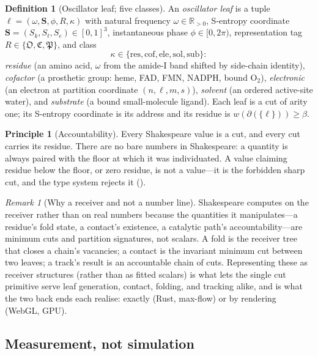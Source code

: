 \documentclass[11pt,a4paper]{article}
\theoremstyle{thmstyle}
\theoremstyle{definition}
\newtheorem{definition}[theorem]{Definition}
\newtheorem{principle}[theorem]{Principle}
\theoremstyle{remark}
\newtheorem{remark}[theorem]{Remark}
\newcommand{\R}{\mathbb{R}}
\newcommand{\flo}{\beta}
\newcommand{\cut}{\partial}
\newcommand{\Osc}{\mathfrak{O}}
\newcommand{\Cat}{\mathfrak{C}}
\newcommand{\Part}{\mathfrak{P}}
\begin{document}
\begin{definition}[Oscillator leaf; five classes]
\label{def:leaf}
An \emph{oscillator leaf} is a tuple
$\ell=(\omega,\mathbf{S},\phi,R,\kappa)$ with natural frequency
$\omega\in\R_{>0}$, S-entropy coordinate
$\mathbf{S}=(S_k,S_t,S_e)\in[0,1]^3$, instantaneous phase
$\phi\in[0,2\pi)$, representation tag $R\in\{\Osc,\Cat,\Part\}$, and class
\[
\kappa\in\{\mathrm{res},\mathrm{cof},\mathrm{ele},\mathrm{sol},\mathrm{sub}\}:
\]
\emph{residue} (an amino acid, $\omega$ from the amide-I band shifted by
side-chain identity), \emph{cofactor} (a prosthetic group: heme, FAD, FMN,
NADPH, bound $\mathrm{O_2}$), \emph{electronic} (an electron at partition
coordinate $(n,\ell,m,s)$), \emph{solvent} (an ordered active-site water),
and \emph{substrate} (a bound small-molecule ligand). Each leaf is a cut
of arity one; its S-entropy coordinate is its address and its residue is
$w(\cut(\{\ell\}))\ge\flo$.
\end{definition}

\begin{principle}[Accountability]
\label{prin:accountability}
Every Shakespeare value is a cut, and every cut carries its residue. There
are no bare numbers in Shakespeare: a quantity is always paired with the
floor at which it was individuated. A value claiming residue below the
floor, or zero residue, is not a value---it is the forbidden sharp cut, and
the type system rejects it ().
\end{principle}

\begin{remark}[Why a receiver and not a number line]
\label{rem:why-receiver}
Shakespeare computes on the receiver rather than on real numbers because
the quantities it manipulates---a residue's fold state, a contact's
existence, a catalytic path's accountability---are minimum cuts and
partition signatures, not scalars. A fold is the receiver tree that closes
a chain's vacancies; a contact is the invariant minimum cut between two
leaves; a track's result is an accountable chain of cuts. Representing
these as receiver structures (rather than as fitted scalars) is what lets
the single cut primitive serve leaf generation, contact, folding, and
tracking alike, and is what the two back ends each realise: exactly (Rust,
max-flow) or by rendering (WebGL, GPU).
\end{remark}

\subsection{Measurement, not simulation}
\end{document}
